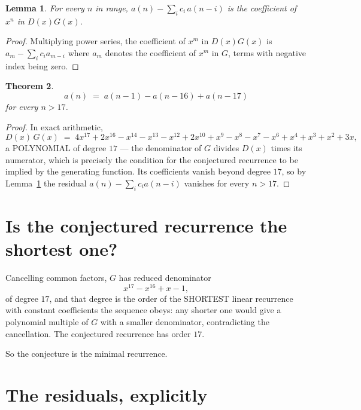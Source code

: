 \documentclass[11pt,a4paper]{article}
\theoremstyle{plain}
\newtheorem{theorem}{Theorem}
\newtheorem{lemma}[theorem]{Lemma}
\theoremstyle{definition}
\begin{document}
\begin{lemma}\label{lem:key}
For every $n$ in range, $a(n)-\sum_i c_i\,a(n-i)$ is the coefficient of $x^{n}$ in
$D(x)G(x)$.
\end{lemma}

\begin{proof}
Multiplying power series, the coefficient of $x^{m}$ in $D(x)G(x)$ is
$a_m-\sum_i c_i a_{m-i}$ where $a_m$ denotes the coefficient of $x^{m}$ in $G$, terms with
negative index being zero.
\end{proof}

\begin{theorem}
\[
a(n)\;=\;a(n-1) - a(n-16) + a(n-17)
\]
for every $n>17$.
\end{theorem}

\begin{proof}
In exact arithmetic,
\[
D(x)\,G(x)\;=\;4 x^{17} + 2 x^{16} - x^{14} - x^{13} - x^{12} + 2 x^{10} + x^{9} - x^{8} - x^{7} - x^{6} + x^{4} + x^{3} + x^{2} + 3 x,
\]
a POLYNOMIAL of degree $17$ --- the denominator of $G$ divides $D(x)$ times its numerator,
which is precisely the condition for the conjectured recurrence to be implied by the
generating function. Its coefficients vanish beyond degree $17$, so by
Lemma~\ref{lem:key} the residual $a(n)-\sum_ic_ia(n-i)$ vanishes for every
$n>17$.
\end{proof}

\section{Is the conjectured recurrence the shortest one?}

Cancelling common factors, $G$ has reduced denominator
\[
x^{17} - x^{16} + x - 1,
\]
of degree $17$, and that degree is the order of the SHORTEST linear recurrence with
constant coefficients the sequence obeys: any shorter one would give a polynomial multiple of
$G$ with a smaller denominator, contradicting the cancellation. The conjectured recurrence has
order $17$.

So the conjecture is the minimal recurrence.

\section{The residuals, explicitly}
\end{document}

